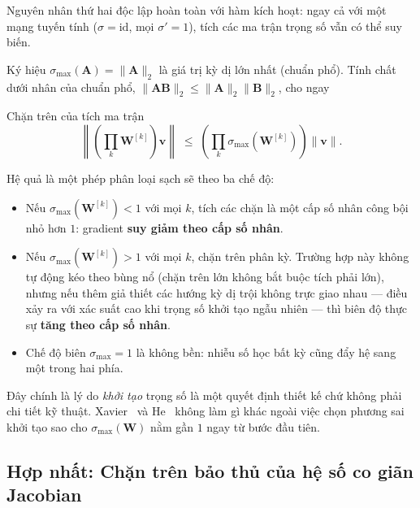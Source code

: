Nguyên nhân thứ hai độc lập hoàn toàn với hàm kích hoạt: ngay cả với một mạng
tuyến tính ($\sigma = \mathrm{id}$, mọi $\sigma' = 1$), tích các ma trận trọng số
vẫn có thể suy biến.

Ký hiệu $\sigma_{\max}(\mathbf{A}) = \|\mathbf{A}\|_2$ là giá trị kỳ dị lớn nhất
(chuẩn phổ). Tính chất dưới nhân của chuẩn phổ,
$\|\mathbf{A}\mathbf{B}\|_2 \le \|\mathbf{A}\|_2\|\mathbf{B}\|_2$, cho ngay

\begin{infobox}{Chặn trên của tích ma trận}
\[
  \left\|\left(\prod_{k}\mathbf{W}^{[k]}\right)\mathbf{v}\right\|
  \;\le\;
  \left(\prod_{k}\sigma_{\max}\!\left(\mathbf{W}^{[k]}\right)\right)\|\mathbf{v}\| .
\]
\end{infobox}

Hệ quả là một phép phân loại sạch sẽ theo ba chế độ:

\begin{itemize}[leftmargin=*, itemsep=2pt]
  \item Nếu $\sigma_{\max}\!\left(\mathbf{W}^{[k]}\right) < 1$ với mọi $k$, tích
    các chặn là một cấp số nhân công bội nhỏ hơn $1$: gradient
    \textbf{suy giảm theo cấp số nhân}.
  \item Nếu $\sigma_{\max}\!\left(\mathbf{W}^{[k]}\right) > 1$ với mọi $k$, chặn
    trên phân kỳ. Trường hợp này không tự động kéo theo bùng nổ (chặn trên lớn
    không bắt buộc tích phải lớn), nhưng nếu thêm giả thiết các hướng kỳ dị
    trội không trực giao nhau --- điều xảy ra với xác suất cao khi trọng số khởi
    tạo ngẫu nhiên --- thì biên độ thực sự \textbf{tăng theo cấp số nhân}.
  \item Chế độ biên $\sigma_{\max} = 1$ là không bền: nhiễu số học bất kỳ cũng
    đẩy hệ sang một trong hai phía.
\end{itemize}

Đây chính là lý do \emph{khởi tạo} trọng số là một quyết định thiết kế chứ không
phải chi tiết kỹ thuật. Xavier~\cite{GlorotBengio2010} và He~\cite{He2015} không
làm gì khác ngoài việc chọn phương sai khởi tạo sao cho
$\sigma_{\max}(\mathbf{W})$ nằm gần $1$ ngay từ bước đầu tiên.

\subsection{Hợp nhất: Chặn trên bảo thủ của hệ số co giãn Jacobian}

